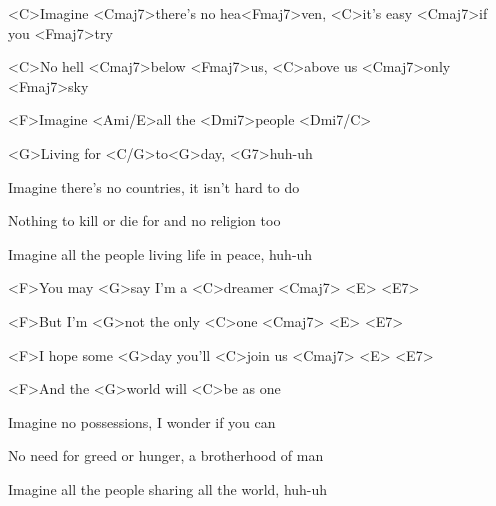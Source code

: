 

\zs
<C>Imagine <Cmaj7>there's no hea<Fmaj7>ven, <C>it's easy <Cmaj7>if you <Fmaj7>try

<C>No hell <Cmaj7>below <Fmaj7>us, <C>above us <Cmaj7>only <Fmaj7>sky

<F>Imagine <Ami/E>all the <Dmi7>people <Dmi7/C>

<G>Living for <C/G>to<G>day, <G7>huh-uh
\ks

\zs
Imagine there's no countries, it isn't hard to do

Nothing to kill or die for and no religion too

Imagine all the people living life in peace, huh-uh
\ks

\zr
<F>You may <G>say I'm a <C>dreamer <Cmaj7> <E> <E7>

<F>But I'm <G>not the only <C>one <Cmaj7> <E> <E7>

<F>I hope some <G>day you'll <C>join us <Cmaj7> <E> <E7>

<F>And the <G>world will <C>be as one
\kr

\zs
Imagine no possessions, I wonder if you can

No need for greed or hunger, a brotherhood of man

Imagine all the people sharing all the world, huh-uh
\ks

\zr\kr

\kp
